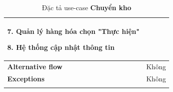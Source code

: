 \begin{longtable}{| p{} | p{} |}
                    7. Quản lý hàng hóa chọn "Thực hiện"
                    
                    8. Hệ thống cập nhật thông tin
                \\
                \hline
                    \textbf{Alternative flow}
                &
                    Không
                \\
                \hline
                    \textbf{Exceptions} 
                &
                    Không
                \\
                \hline
                \caption{Đặc tả use-case \textbf{Chuyển kho}}
            \end{longtable}

